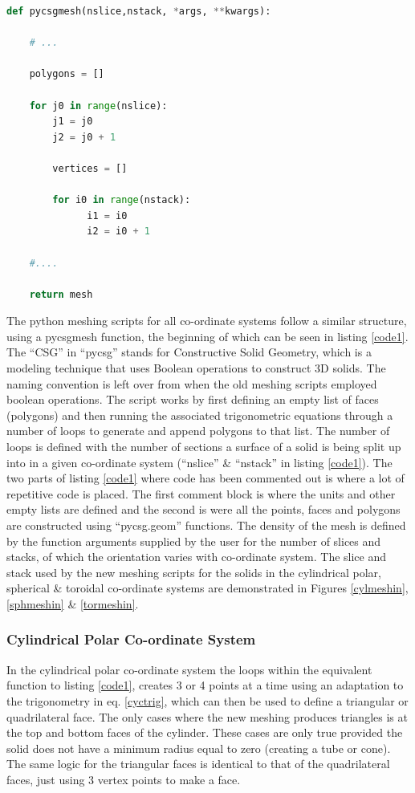 \documentclass[12pt,a4paper]{article}
\begin{document}
\begin{lstlisting}[language=python, label=code1, caption=Basic python function structure for new meshing of primitive solid in Pyg4ometry.]
def pycsgmesh(nslice,nstack, *args, **kwargs):

    # ... 
    
    polygons = []

    for j0 in range(nslice):
        j1 = j0
        j2 = j0 + 1
    
        vertices = []

        for i0 in range(nstack):
              i1 = i0
              i2 = i0 + 1     
              
    #....
    
    return mesh

\end{lstlisting}

\noindent The python meshing scripts for all co-ordinate systems follow a similar structure, using a pycsgmesh function, the beginning of which can be seen in listing \ref{code1}. The ``CSG'' in ``pycsg'' stands for Constructive Solid Geometry, which is a modeling technique that uses Boolean operations to construct 3D solids. The naming convention is left over from when the old meshing scripts employed boolean operations. The script works by first defining an empty list of faces (polygons) and then running the associated trigonometric equations through a number of loops to generate and append polygons to that list. The number of loops is defined with the number of sections a surface of a solid is being split up into in a given co-ordinate system (``nslice'' \& ``nstack'' in listing \ref{code1}). The two parts of listing \ref{code1} where code has been commented out is where a lot of repetitive code is placed. The first comment block is where the units and other empty lists are defined and the second is were all the points, faces and polygons are constructed using ``pycsg.geom'' functions. The density of the mesh is defined by the function arguments supplied by the user for the number of slices and stacks, of which the orientation varies with co-ordinate system. The slice and stack used by the new meshing scripts for the solids in the cylindrical polar, spherical \& toroidal co-ordinate systems are demonstrated in Figures \ref{cylmeshin}, \ref{sphmeshin} \& \ref{tormeshin}.

\subsubsection{Cylindrical Polar Co-ordinate System}
\label{cycl}
In the cylindrical polar co-ordinate system the loops within the equivalent function to listing \ref{code1}, creates 3 or 4 points at a time using an adaptation to the trigonometry in eq. \ref{cyctrig}, which can then be used to define a triangular or quadrilateral face. The only cases where the new meshing produces triangles is at the top and bottom faces of the cylinder. These cases are only true provided the solid does not have a minimum radius equal to zero (creating a tube or cone). The same logic for the triangular faces is identical to that of the quadrilateral faces, just using 3 vertex points to make a face.
\end{document}
